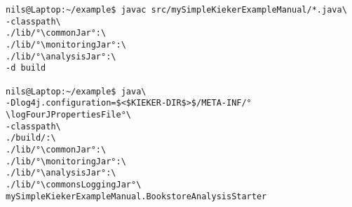 \begin{lstlisting} 			
nils@Laptop:~/example$ javac src/mySimpleKiekerExampleManual/*.java\
-classpath\ 		
./lib/°\commonJar°:\
./lib/°\monitoringJar°:\
./lib/°\analysisJar°:\
-d build

nils@Laptop:~/example$ java\
-Dlog4j.configuration=$<$KIEKER-DIR$>$/META-INF/°\logFourJPropertiesFile°\
-classpath\ 	
./build/:\
./lib/°\commonJar°:\
./lib/°\monitoringJar°:\
./lib/°\analysisJar°:\
./lib/°\commonsLoggingJar°\
mySimpleKiekerExampleManual.BookstoreAnalysisStarter 
\end{lstlisting}	
